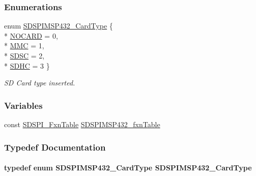 \subsubsection*{Enumerations}
\begin{DoxyCompactItemize}
\item 
enum \hyperlink{_s_d_s_p_i_m_s_p432_8h_ac9da30e77207a761e49f62dac9ee8996}{S\+D\+S\+P\+I\+M\+S\+P432\+\_\+\+Card\+Type} \{ \\*
\hyperlink{_s_d_s_p_i_m_s_p432_8h_ac9da30e77207a761e49f62dac9ee8996a422cdc20ba86c8cdcf1f0fd2318a1cfc}{N\+O\+C\+A\+R\+D} = 0, 
\\*
\hyperlink{_s_d_s_p_i_m_s_p432_8h_ac9da30e77207a761e49f62dac9ee8996aa7d8fca3406f36682514f0384d910fac}{M\+M\+C} = 1, 
\\*
\hyperlink{_s_d_s_p_i_m_s_p432_8h_ac9da30e77207a761e49f62dac9ee8996a87550a2102744c14e5e2e0ed39cc04b2}{S\+D\+S\+C} = 2, 
\\*
\hyperlink{_s_d_s_p_i_m_s_p432_8h_ac9da30e77207a761e49f62dac9ee8996ab27db2a19a825c3e6f1513cdab7c81ea}{S\+D\+H\+C} = 3
 \}
\begin{DoxyCompactList}\small\item\em S\+D Card type inserted. \end{DoxyCompactList}\end{DoxyCompactItemize}
\subsubsection*{Variables}
\begin{DoxyCompactItemize}
\item 
const \hyperlink{struct_s_d_s_p_i___fxn_table}{S\+D\+S\+P\+I\+\_\+\+Fxn\+Table} \hyperlink{_s_d_s_p_i_m_s_p432_8h_a4a2ef2f02901235bce77859ca1d0fe70}{S\+D\+S\+P\+I\+M\+S\+P432\+\_\+fxn\+Table}
\end{DoxyCompactItemize}


\subsubsection{Typedef Documentation}
\paragraph[{S\+D\+S\+P\+I\+M\+S\+P432\+\_\+\+Card\+Type}]{\setlength{\rightskip}{0pt plus 5cm}typedef enum {\bf S\+D\+S\+P\+I\+M\+S\+P432\+\_\+\+Card\+Type}  {\bf S\+D\+S\+P\+I\+M\+S\+P432\+\_\+\+Card\+Type}}\label{_s_d_s_p_i_m_s_p432_8h_aad861043f3776932f1db6be9288d1ac3}


